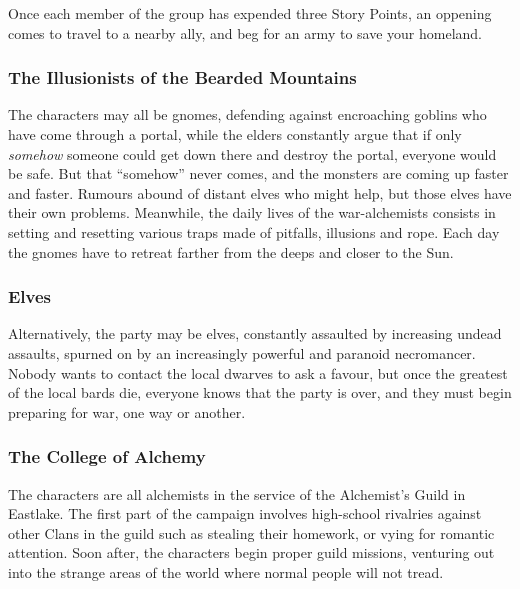 \documentclass[titlepage,a4paper,openany]{book}
\begin{document}
\begin{multicols}{2}
Once each member of the group has expended three Story Points, an oppening comes to travel to a nearby ally, and beg for an army to save your homeland.

\subsubsection{The Illusionists of the Bearded Mountains}

The characters may all be gnomes, defending against encroaching goblins who have come through a portal, while the elders constantly argue that if only \emph{somehow} someone could get down there and destroy the portal, everyone would be safe.
But that ``somehow'' never comes, and the monsters are coming up faster and faster.
Rumours abound of distant elves who might help, but those elves have their own problems.
Meanwhile, the daily lives of the war-alchemists consists in setting and resetting various traps made of pitfalls, illusions and rope.  Each day the gnomes have to retreat farther from the deeps and closer to the Sun.

\subsubsection{Elves}

Alternatively, the party may be elves, constantly assaulted by increasing undead assaults, spurned on by an increasingly powerful and paranoid necromancer.
Nobody wants to contact the local dwarves to ask a favour, but once the greatest of the local bards die, everyone knows that the party is over, and they must begin preparing for war, one way or another.

\subsubsection{The College of Alchemy}

The characters are all alchemists in the service of the Alchemist's Guild in Eastlake.  The first part of the campaign involves high-school rivalries against other Clans in the guild such as stealing their homework, or vying for romantic attention.  Soon after, the characters begin proper guild missions, venturing out into the strange areas of the world where normal people will not tread.

\end{multicols}

\vspace{.2cm}
\end{document}
